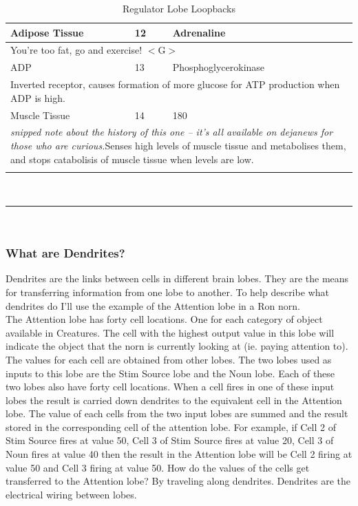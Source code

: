 \documentclass[11pt,twoside,a4paper]{article}
\begin{document}
\begin{longtable}{|p{}|p{}|p{}|}
Adipose Tissue	&	12	&	Adrenaline \\ \hline
\multicolumn{3}{|p{0.90\textwidth}|}{You're too fat, go and exercise! $<$G$>$ } \\ \hline
ADP		&	13	&	Phosphoglycerokinase \\ \hline
\multicolumn{3}{|p{0.90\textwidth}|}{Inverted receptor, causes formation of more glucose for ATP production when ADP is high. } \\ \hline
Muscle Tissue	&	14	&	180 \\ \hline
\multicolumn{3}{|p{0.90\textwidth}|}{\emph{snipped note about the history of this one -- it's all available on dejanews for those who are curious.}Senses high levels of muscle tissue and metabolises them, and stops catabolisis of muscle tissue when levels are low. } \\ \hline
		\hline
	\caption{Regulator Lobe Loopbacks}
	\label{tab:Regulator_Lobe_Loopbacks}\\
\end{longtable}~\\

\rule{10cm}{0.5mm}~\\

\subsubsection{What are Dendrites?}

Dendrites are the links between cells in different brain lobes. They are the means for transferring information from one lobe to another. To help describe what dendrites do I'll use the example of the Attention lobe in a Ron norn.~\\

The Attention lobe has forty cell locations. One for each category of object available in Creatures. The cell with the highest output value in this lobe will indicate the object that the norn is currently looking at (ie. paying attention to). The values for each cell are obtained from other lobes. The two lobes used as inputs to this lobe are the Stim Source lobe and the Noun lobe. Each of these two lobes also have forty cell locations. When a cell fires in one of these input lobes the result is carried down dendrites to the equivalent cell in the Attention lobe. The value of each cells from the two input lobes are summed and the result stored in the corresponding cell of the attention lobe. For example, if Cell 2 of Stim Source fires at value 50, Cell 3 of Stim Source fires at value 20, Cell 3 of Noun fires at value 40 then the result in the Attention lobe will be Cell 2 firing at value 50 and Cell 3 firing at value 50. How do the values of the cells get transferred to the Attention lobe? By traveling along dendrites. Dendrites are the electrical wiring between lobes.~\\
\end{document}
